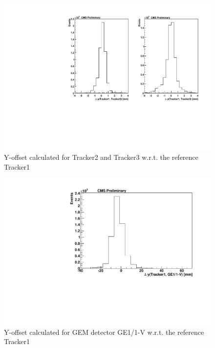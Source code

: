 \begin{figure}[!htbp]
\centering
\includegraphics[width=5.1in]{figures/GEM/Offset_For_Tracker1vs23y_Run1897.pdf}
\caption{Y-offset calculated for Tracker2 and Tracker3 w.r.t. the reference Tracker1}\label{fig:Yoff}
\end{figure}

\begin{figure}[!htbp]
\centering
\includegraphics[width=5.1in]{figures/GEM/Offset_Tracker1vsGE11V_X_For_Run1897.pdf}
\caption{Y-offset calculated for GEM detector GE1/1-V w.r.t. the reference Tracker1}\label{fig:offGEM1}
\end{figure}


